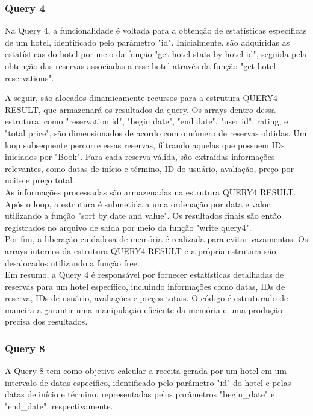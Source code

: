 \documentclass[12pt,a4paper]{article}
\begin{document}
    \subsubsection{Query 4}
    \hspace{0,6cm}Na Query 4, a funcionalidade é voltada para a obtenção de estatísticas específicas de um hotel, identificado pelo parâmetro "id". Inicialmente, são adquiridas as estatísticas do hotel por meio da função "get hotel stats by hotel id", seguida pela obtenção das reservas associadas a esse hotel através da função "get hotel reservations".
        
    A seguir, são alocados dinamicamente recursos para a estrutura QUERY4 RESULT, que armazenará os resultados da query. Os arrays dentro dessa estrutura, como "reservation id", "begin date", "end date", "user id", rating, e "total price", são dimensionados de acordo com o número de reservas obtidas. Um loop subsequente percorre essas reservas, filtrando aquelas que possuem IDs iniciados por "Book". Para cada reserva válida, são extraídas informações relevantes, como datas de início e término, ID do usuário, avaliação, preço por noite e preço total.\\
    
    As informações processadas são armazenadas na estrutura QUERY4 RESULT. Após o loop, a estrutura é submetida a uma ordenação por data e valor, utilizando a função "sort by date and value". Os resultados finais são então registrados no arquivo de saída por meio da função "write query4".\\
    
    Por fim, a liberação cuidadosa de memória é realizada para evitar vazamentos. Os arrays internos da estrutura QUERY4 RESULT e a própria estrutura são desalocados utilizando a função free.\\
    
    Em resumo, a Query 4 é responsável por fornecer estatísticas detalhadas de reservas para um hotel específico, incluindo informações como datas, IDs de reserva, IDs de usuário, avaliações e preços totais. O código é estruturado de maneira a garantir uma manipulação eficiente da memória e uma produção precisa dos resultados.

    \subsubsection{Query 8}
    \hspace{0,6cm}A Query 8 tem como objetivo calcular a receita gerada por um hotel em um intervalo de datas específico, identificado pelo parâmetro "id" do hotel e pelas datas de início e término, representadas pelos parâmetros "begin\_date" e "end\_date", respectivamente.\\
\end{document}
